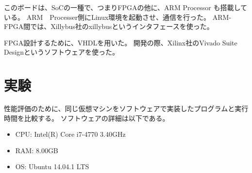 \documentclass[12pt,oneside]{report}
\begin{document}
このボードは、SoCの一種で、つまりFPGAの他に、ARM Processor も搭載している。
ARM　Processer側にLinux環境を起動させ、通信を行った。
ARM-FPGA間では、Xillybus社のxillybusというインタフェースを使った。

FPGA設計するために、VHDLを用いた。
開発の際、Xilinx社のVivado Suite Designというソフトウェアを使った。






\chapter{実験}
\label{exp}

性能評価のために、同じ仮想マシンをソフトウェアで実装したプログラムと実行時間を比較する。
ソフトウェアの詳細は以下である。




\begin{itemize}
		\item CPU: Intel(R) Core i7-4770  3.40GHz
		\item RAM: 8.00GB
		\item OS: Ubuntu 14.04.1 LTS
\end{itemize}
\end{document}
